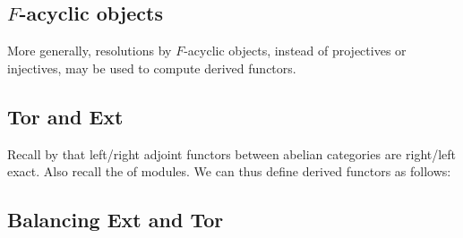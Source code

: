 





\subsection{$F$-acyclic objects}

More generally, resolutions by $F$-acyclic objects, instead of projectives or injectives, may be used to compute derived functors.








\subsection{Tor and Ext}


Recall by  that left/right adjoint functors between abelian categories are right/left exact. Also recall the  of modules. We can thus define derived functors as follows:






\subsection{Balancing Ext and Tor}

